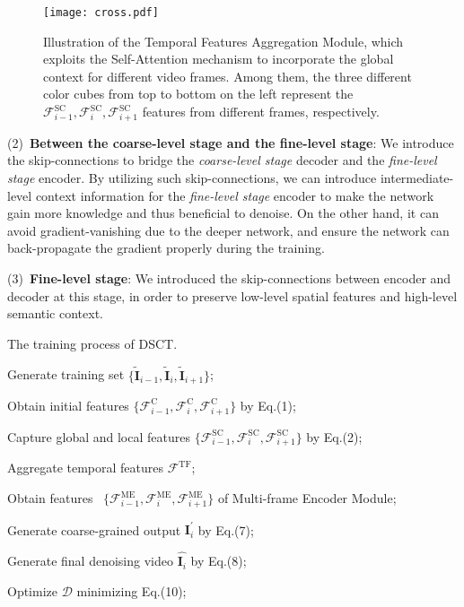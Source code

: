 \documentclass[journal]{IEEEtran}
\begin{document}
\begin{figure}[t]
    \centering
    \texttt{[image: cross.pdf]}
    \caption{Illustration of the Temporal Features Aggregation Module, which exploits the Self-Attention mechanism to incorporate the global context for different video frames. Among them, the three different color cubes from top to bottom on the left represent the  $\mathcal{F}_ {i-1}^\text{SC}, \mathcal{F}_{i}^\text{SC}, \mathcal{F}_{i+1}^\text{SC}$ features from different frames, respectively.}
    \label{fig:4}
\end{figure} 

\noindent(2)~\textbf{Between the coarse-level stage and the fine-level stage}:
We introduce the skip-connections to bridge the \emph{coarse-level stage} decoder and the \emph{fine-level stage} encoder. By utilizing such skip-connections, we can introduce intermediate-level context information for the \emph{fine-level stage} encoder to make the network gain more knowledge and thus beneficial to denoise. On the other hand, it can avoid gradient-vanishing due to the deeper network, and ensure the network can back-propagate the gradient properly during the training. 

\noindent(3)~\textbf{Fine-level stage}: We introduced the skip-connections between encoder and decoder at this stage, in order to preserve low-level spatial features and high-level semantic context.


\begin{algorithm}[h]
  \caption{The training process of DSCT.}
  \label{alg:1}
  \LinesNumbered  
  {
  {
  {
  Generate training set $\{\tilde{\mathbf{I}}_{i-1}, {\tilde{\mathbf{I}}}_{i},{\tilde{\mathbf{I}}}_{i+1}\}$;

  Obtain initial features $\{\mathcal{F}_{i-1}^{\text{C}}, \mathcal{F}_{i}^{\text{C}},\mathcal{F}_ {i+1}^{\text{C}}\}$ by Eq.(1);
 
  Capture global and local features $\{\mathcal{F}_{i-1}^\text{SC}, \mathcal{F}_{i}^{\text{SC}}, \mathcal{F}_{i+1}^{\text{SC}}\}$ by Eq.(2);
 
  Aggregate temporal features $\mathcal{F}^{\text {TF}}$;
 
  Obtain features ~$\{\mathcal{F}_{i-1}^\text{ME}, \mathcal{F}_{i}^\text{ME}, \mathcal{F}_{i+1}^\text{ME}\}$ of Multi-frame Encoder Module;
 
  Generate coarse-grained output $\mathbf{I}^{\prime}_{i}$ by Eq.(7);

  Generate final denoising video  $\hat{\mathbf{I}_{i}}$ by Eq.(8);

  Optimize $\mathcal{D}$ minimizing  Eq.(10);
   }
  }
 }
\end{algorithm}
\end{document}
